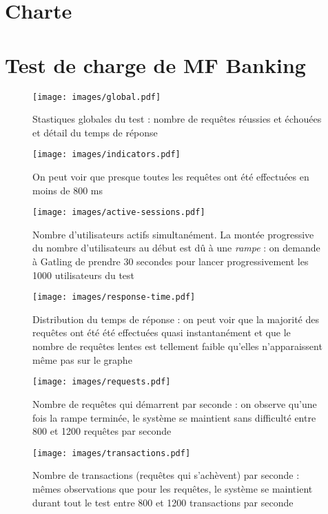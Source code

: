\appendix

\chapter{Charte \excilys{}}
\label{ann:charte}


\chapter{Test de charge de MF Banking}
\label{ann:gatling}
\begin{figure}[h!]
	\centering
		\texttt{[image: images/global.pdf]}
	\caption{Stastiques globales du test : nombre de requêtes réussies et échouées et détail du temps de réponse}
\end{figure}

\begin{figure}[h!]
	\centering
		\texttt{[image: images/indicators.pdf]}
	\caption{On peut voir que presque toutes les requêtes ont été effectuées en moins de 800 ms}
\end{figure}

\begin{figure}[h!]
	\centering
		\texttt{[image: images/active-sessions.pdf]}
	\caption{Nombre d'utilisateurs actifs simultanément. La montée progressive du nombre d'utilisateurs au début est dû à une \textit{rampe} : on demande à Gatling de prendre 30 secondes pour lancer progressivement les 1000 utilisateurs du test}
\end{figure}

\begin{figure}[h!]
	\centering
		\texttt{[image: images/response-time.pdf]}
	\caption{Distribution du temps de réponse : on peut voir que la majorité des requêtes ont été été effectuées quasi instantanément et que le nombre de requêtes lentes est tellement faible qu'elles n'apparaissent même pas sur le graphe}
\end{figure}

\begin{figure}[h!]
	\centering
		\texttt{[image: images/requests.pdf]}
	\caption{Nombre de requêtes qui démarrent par seconde : on observe qu'une fois la rampe terminée, le système se maintient sans difficulté entre 800 et 1200 requêtes par seconde}
\end{figure}

\begin{figure}[h!]
	\centering
		\texttt{[image: images/transactions.pdf]}
	\caption{Nombre de transactions (requêtes qui s'achèvent) par seconde : mêmes observations que pour les requêtes, le système se maintient durant tout le test entre 800 et 1200 transactions par seconde}
\end{figure}


